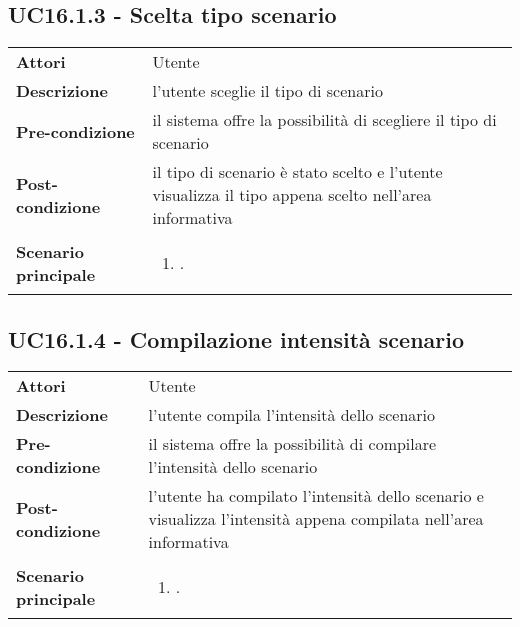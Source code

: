 \subsection{UC16.1.3 - Scelta tipo scenario} 
\label{sssec:UC16.1.3} 
\def\arraystretch{1.5}
\begin{tabularx}{\textwidth}{l|p{}}
	\rowcolor{I} \multicolumn{2}{c}{\color{white}\textbf{UC16.1.3 - Scelta tipo scenario}} \\
	\toprule
	\endhead
	\textbf{Attori} & Utente\\
	\textbf{Descrizione} & l'utente sceglie il tipo di scenario\\
	\textbf{Pre-condizione} & il sistema offre la possibilità di scegliere il tipo di scenario\\
	\textbf{Post-condizione} & il tipo di scenario è stato scelto e l'utente visualizza il tipo appena scelto nell'area informativa\\
	\textbf{Scenario principale} & \vspace{-1.2em}\begin{enumerate}[leftmargin=*,noitemsep,nosep]
		\item \nameref{sssec:UC16.1.3}.
	\end{enumerate}\\
	\bottomrule
\end{tabularx}
\subsection{UC16.1.4 - Compilazione intensità scenario} 
\label{sssec:UC16.1.4} 
\def\arraystretch{1.5}
\begin{tabularx}{\textwidth}{l|p{}}
	\rowcolor{I} \multicolumn{2}{c}{\color{white}\textbf{UC16.1.4 - Compilazione intensità scenario}} \\
	\toprule
	\endhead
	\textbf{Attori} & Utente\\
	\textbf{Descrizione} & l'utente compila l'intensità dello scenario\\
	\textbf{Pre-condizione} & il sistema offre la possibilità di compilare l'intensità dello scenario\\
	\textbf{Post-condizione} & l'utente ha compilato l'intensità dello scenario e visualizza l'intensità appena compilata nell'area informativa\\
	\textbf{Scenario principale} & \vspace{-1.2em}\begin{enumerate}[leftmargin=*,noitemsep,nosep]
		\item \nameref{sssec:UC16.1.4}.
	\end{enumerate}\\
	\bottomrule
\end{tabularx}

